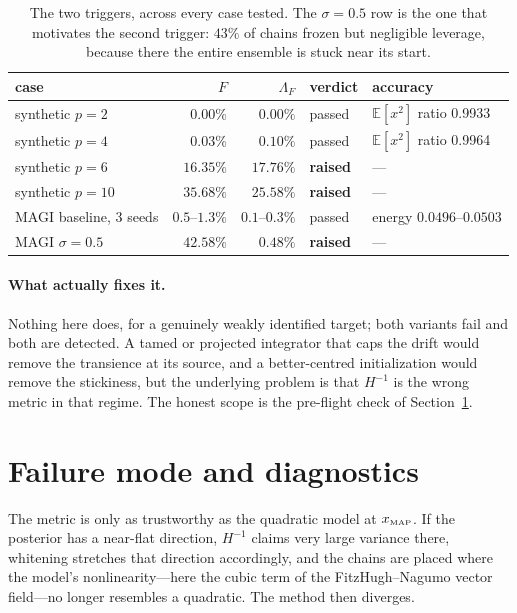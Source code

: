 \documentclass[11pt]{article}
\newcommand{\E}{\mathbb{E}}
\newcommand{\xmap}{x_{\text{\tiny MAP}}}
\begin{document}
\begin{table}[t]
\centering
\begin{tabular}{lrrll}
\toprule
case & $F$ & $\Lambda_F$ & verdict & accuracy \\
\midrule
synthetic $p=2$    & $0.00\%$  & $0.00\%$  & passed & $\E[x^2]$ ratio 0.9933 \\
synthetic $p=4$    & $0.03\%$  & $0.10\%$  & passed & $\E[x^2]$ ratio 0.9964 \\
synthetic $p=6$    & $16.35\%$ & $17.76\%$ & \textbf{raised} & --- \\
synthetic $p=10$   & $35.68\%$ & $25.58\%$ & \textbf{raised} & --- \\
MAGI baseline, 3 seeds & $0.5$--$1.3\%$ & $0.1$--$0.3\%$ & passed & energy $0.0496$--$0.0503$ \\
MAGI $\sigma=0.5$  & $42.58\%$ & $0.48\%$  & \textbf{raised} & --- \\
\bottomrule
\end{tabular}
\caption{The two triggers, across every case tested. The $\sigma=0.5$ row is the one that
motivates the second trigger: $43\%$ of chains frozen but negligible leverage, because there the
entire ensemble is stuck near its start.}
\label{tab:guard}
\end{table}

\paragraph{What actually fixes it.} Nothing here does, for a genuinely weakly identified target;
both variants fail and both are detected. A tamed or projected integrator that caps the drift
would remove the transience at its source, and a better-centred initialization would remove the
stickiness, but the underlying problem is that $H^{-1}$ is the wrong metric in that regime. The
honest scope is the pre-flight check of Section~\ref{sec:failure}.

\section{Failure mode and diagnostics}
\label{sec:failure}

The metric is only as trustworthy as the quadratic model at $\xmap$. If the posterior has a
near-flat direction, $H^{-1}$ claims very large variance there, whitening stretches that direction
accordingly, and the chains are placed where the model's nonlinearity---here the cubic term of the
FitzHugh--Nagumo vector field---no longer resembles a quadratic. The method then diverges.
\end{document}
